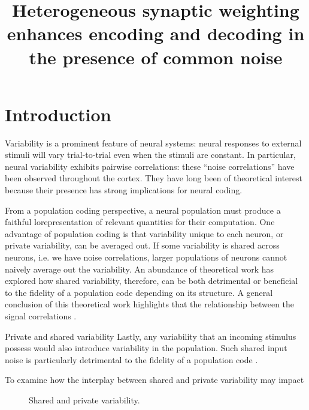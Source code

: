 \documentclass[11pt]{article}
\title{Heterogeneous synaptic weighting enhances encoding and decoding in the presence of common noise}
\date{}
\begin{document}
	\maketitle
	
	\section{Introduction}
	Variability is a prominent feature of neural systems: neural responses to external stimuli will vary trial-to-trial even when the stimuli are constant. In particular, neural variability exhibits pairwise correlations: these ``noise correlations'' have been observed throughout the cortex. They have long been of theoretical interest because their presence has strong implications for neural coding.
	
	From a population coding perspective, a neural population must produce a faithful lorepresentation of relevant quantities for their computation. One advantage of population coding is that variability unique to each neuron, or private variability, can be averaged out. If some variability is shared across neurons, i.e. we have noise correlations, larger populations of neurons cannot naively average out the variability. An abundance of theoretical work has explored how shared variability, therefore, can be both detrimental or beneficial to the fidelity of a population code depending on its structure. A  general conclusion of this theoretical work highlights that the relationship between the signal correlations .
	
	Private and shared variability  Lastly, any variability that an incoming stimulus possess would also introduce variability in the population. Such shared input noise is particularly detrimental to the fidelity of a population code \cite{Moreno-Bote2014, Kanitscheider2015}.
	
	To examine how the interplay between shared and private variability may impact 
	\begin{figure}[b]
		\centering
		\caption{Shared and private variability.}
		\label{fig:private-shared}
	\end{figure}
	\newpage 
	
\end{document}

